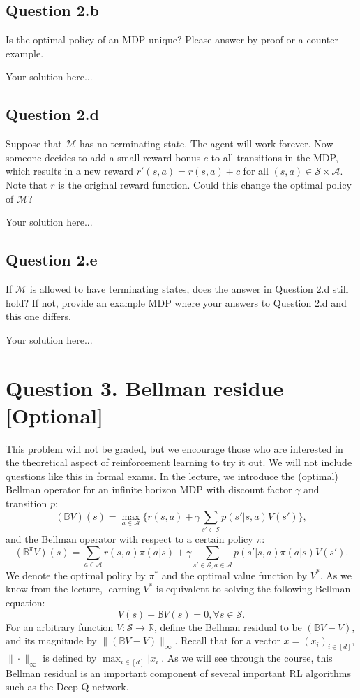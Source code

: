 \documentclass[12pt]{article}
\newcommand*{\bo}{\mathbb{B}}
\begin{document}
\subsection*{Question 2.b}
Is the optimal policy of an MDP unique? Please answer by proof or a counter-example.
\begin{solution}
Your solution here...
\end{solution}
\subsection*{Question 2.d}
Suppose that $\mathcal{M}$ has no terminating state. The agent will work forever. Now someone decides to add a small reward bonus $c$ to all transitions in the MDP, which results in a new reward $r'(s,a) = r(s,a)+c$ for all $(s,a)\in \mathcal{S}\times\mathcal{A}$. Note that $r$ is the original reward function. Could this change the optimal policy of $\mathcal{M}$?
\begin{solution}
    Your solution here...
\end{solution}
\subsection*{Question 2.e}
If $\mathcal{M}$ is allowed to have terminating states, does the answer in Question 2.d still hold? If not,  provide an example MDP where your answers to Question 2.d and this one differs.
\begin{solution}
    Your solution here...
\end{solution}
\section*{Question 3. Bellman residue [Optional]}
This problem will not be graded, but we encourage those who are interested in the theoretical aspect of reinforcement learning to try it out. We will not include questions like this in formal exams. In the lecture, we introduce the (optimal) Bellman operator for an infinite horizon MDP with discount factor $\gamma$ and transition $p$:
$$(\bo V)(s) = \max_{a\in\mathcal{A}} \bigg\{r(s,a) + \gamma \sum_{s'\in\mathcal{S}} p(s'|s,a) V(s')\bigg\},$$
and the Bellman operator with respect to a certain policy $\pi$:
$$(\bo^\pi V)(s) = \sum_{a\in\mathcal{A}} r(s,a)\pi(a|s)+ \gamma \sum_{s'\in\mathcal{S},a\in \mathcal{A}} p(s'|s,a)\pi(a|s) V(s').$$
We denote the optimal policy by $\pi^*$ and the optimal value function by $V^*$. As we know from the lecture, learning $V^*$ is equivalent to solving the following Bellman equation:
$$V(s) -\bo V(s) = 0, \forall s \in \mathcal{S}.$$
For an arbitrary function $V: \mathcal{S} \rightarrow \mathbb{R}$, define the Bellman residual to be $(\bo V - V ) $, and its magnitude by $\|(\bo V - V )\|_\infty$. Recall that for a vector $x = (x_i)_{i\in[d]}$, $\|\cdot\|_\infty$ is defined by $\max_{i\in[d]} |x_i|$. As we will see through the course, this Bellman residual is an important component of several important RL algorithms such as the Deep Q-network. 
\end{document}
